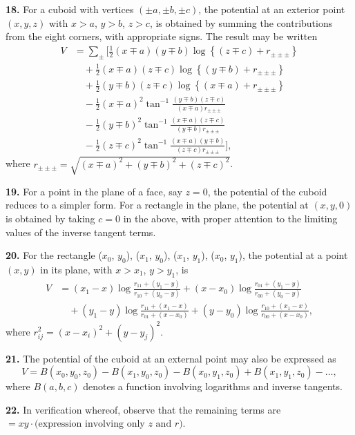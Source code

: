 \documentclass[11pt,a4paper]{book}
\begin{document}
\smallskip\noindent\textbf{18.}\quad
For a cuboid with vertices $(\pm a, \pm b, \pm c)$, the potential at an
exterior point $(x,y,z)$ with $x>a$, $y>b$, $z>c$, is obtained by summing
the contributions from the eight corners, with appropriate signs. The result
may be written
\begin{align*}
V &= \sum_{\pm} \Bigg[
    \tfrac{1}{2}(x\mp a)(y\mp b)\log\left\{(z\mp c)+r_{\pm\pm\pm}\right\} \\
  &\quad + \tfrac{1}{2}(x\mp a)(z\mp c)\log\left\{(y\mp b)+r_{\pm\pm\pm}\right\} \\
  &\quad + \tfrac{1}{2}(y\mp b)(z\mp c)\log\left\{(x\mp a)+r_{\pm\pm\pm}\right\} \\
  &\quad - \tfrac{1}{2}(x\mp a)^2
      \tan^{-1}\frac{(y\mp b)(z\mp c)}{(x\mp a)r_{\pm\pm\pm}} \\
  &\quad - \tfrac{1}{2}(y\mp b)^2
      \tan^{-1}\frac{(x\mp a)(z\mp c)}{(y\mp b)r_{\pm\pm\pm}} \\
  &\quad - \tfrac{1}{2}(z\mp c)^2
      \tan^{-1}\frac{(x\mp a)(y\mp b)}{(z\mp c)r_{\pm\pm\pm}}
  \Bigg],
\end{align*}
where $r_{\pm\pm\pm}=\sqrt{(x\mp a)^2+(y\mp b)^2+(z\mp c)^2}$.

\newpage
\noindent\textbf{19.}\quad
For a point in the plane of a face, say $z=0$, the potential of the cuboid
reduces to a simpler form. For a rectangle in the plane, the potential at
$(x,y,0)$ is obtained by taking $c=0$ in the above, with proper attention to
the limiting values of the inverse tangent terms.

\smallskip\noindent\textbf{20.}\quad
For the rectangle ($x_0$, $y_0$), ($x_1$, $y_0$), ($x_1$, $y_1$), ($x_0$, $y_1$),
the potential at a point $(x,y)$ in its plane, with $x>x_1$, $y>y_1$, is
\begin{align*}
V &= (x_1-x)\log\frac{r_{11}+(y_1-y)}{r_{10}+(y_0-y)}
  + (x-x_0)\log\frac{r_{01}+(y_1-y)}{r_{00}+(y_0-y)} \\
  &\quad + (y_1-y)\log\frac{r_{11}+(x_1-x)}{r_{01}+(x-x_0)}
  + (y-y_0)\log\frac{r_{10}+(x_1-x)}{r_{00}+(x-x_0)},
\end{align*}
where $r_{ij}^2=(x-x_i)^2+(y-y_j)^2$.

\smallskip\noindent\textbf{21.}\quad
The potential of the cuboid at an external point may also be expressed as
\[
V = B(x_0,y_0,z_0) - B(x_1,y_0,z_0) - B(x_0,y_1,z_0)
  + B(x_1,y_1,z_0) - \ldots,
\]
where $B(a,b,c)$ denotes a function involving logarithms and inverse
tangents.

\smallskip\noindent\textbf{22.}\quad
In verification whereof, observe that the remaining terms are
$=xy\cdot\text{(expression involving only $z$ and $r$)}$.
\end{document}
